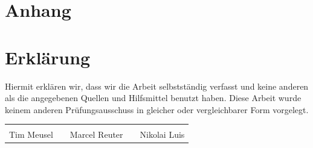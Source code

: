 
\printglossaries%

\printbibliography[heading=bibnumbered]

\chapter{Anhang}


\FloatBarrier

\FloatBarrier


\chapter{Erklärung}
Hiermit erklären wir, dass wir die Arbeit selbstständig verfasst und keine
anderen als die angegebenen Quellen und Hilfsmittel benutzt haben. Diese Arbeit
wurde keinem anderen Prüfungsausschuss in gleicher oder vergleichbarer Form
vorgelegt.

\vspace{10ex}
{\centering
\renewcommand{\arraystretch}{0.9}
\begin{tabular}{p{}p{}p{}p{}p{}}
  \dotfill                    & & \dotfill                      & & \dotfill \\
  \centering\footnotesize{Tim Meusel}& & \centering\footnotesize{Marcel Reuter}& & \centering\footnotesize{Nikolai Luis}%
\end{tabular}
}

